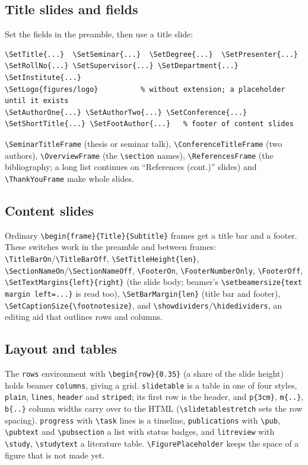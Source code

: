 \documentclass[a4paper,11pt]{article}
\newcommand\cs[1]{\texttt{\textbackslash #1}}
\newcommand\env[1]{\texttt{#1}}
\newcommand\opt[1]{\texttt{#1}}
\begin{document}
\subsection{Title slides and fields}

Set the fields in the preamble, then use a title slide:
\begin{Verbatim}
\SetTitle{...}  \SetSeminar{...}  \SetDegree{...}  \SetPresenter{...}
\SetRollNo{...} \SetSupervisor{...} \SetDepartment{...} \SetInstitute{...}
\SetLogo{figures/logo}          % without extension; a placeholder until it exists
\SetAuthorOne{...} \SetAuthorTwo{...} \SetConference{...}
\SetShortTitle{...} \SetFootAuthor{...}   % footer of content slides
\end{Verbatim}
\cs{SeminarTitleFrame} (thesis or seminar talk), \cs{ConferenceTitleFrame}
(two authors), \cs{OverviewFrame} (the \cs{section} names),
\cs{ReferencesFrame} (the bibliography; a long list continues on
``References (cont.)'' slides) and \cs{ThankYouFrame} make whole slides.

\subsection{Content slides}

Ordinary \verb|\begin{frame}{Title}{Subtitle}| frames get a title bar and a
footer. These switches work in the preamble and between frames:
\cs{TitleBarOn}/\cs{TitleBarOff}, \cs{SetTitleHeight}\verb|{len}|,
\cs{SectionNameOn}/\cs{SectionNameOff}, \cs{FooterOn}, \cs{FooterNumberOnly},
\cs{FooterOff}, \cs{SetTextMargins}\verb|{left}{right}| (the slide body;
beamer's \verb|\setbeamersize{text margin left=...}| is read too),
\cs{SetBarMargin}\verb|{len}| (title bar and footer),
\cs{SetCaptionSize}\verb|{\footnotesize}|, and
\cs{showdividers}/\cs{hidedividers}, an editing aid that outlines rows and
columns.

\subsection{Layout and tables}

The \env{rows} environment with \verb|\begin{row}{0.35}| (a share of the
slide height) holds beamer \env{columns}, giving a grid.
\env{slidetable} is a table in one of four styles, \opt{plain},
\opt{lines}, \opt{header} and \opt{striped}; its first row is the header,
and \texttt{p\{3cm\}}, \texttt{m\{..\}}, \texttt{b\{..\}} column widths carry
over to the HTML (\cs{slidetablestretch} sets the row spacing).
\env{progress} with \cs{task} lines is a timeline, \env{publications} with
\cs{pub}, \cs{pubtext} and \cs{pubsection} a list with status badges, and
\env{litreview} with \cs{study}, \cs{studytext} a literature table.
\cs{FigurePlaceholder} keeps the space of a figure that is not made yet.
\end{document}
